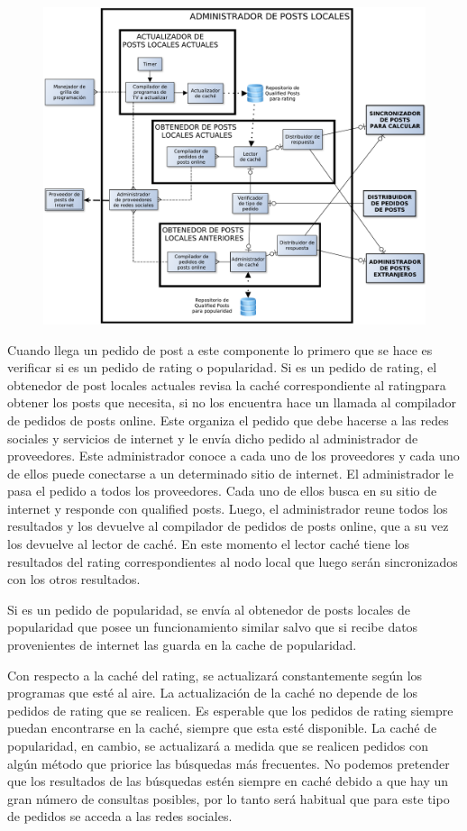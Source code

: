 \begin{figure}[H]
\centering
\includegraphics[width=\textwidth]{graph/adminlocal.pdf}
\end{figure}

Cuando llega un pedido de post a este componente lo primero que se hace es verificar si es un pedido de rating o popularidad. 
Si es un pedido de rating, el obtenedor de post locales actuales revisa la caché correspondiente al ratingpara obtener los posts que necesita, si no los encuentra hace un llamada al compilador de pedidos de posts online. Este organiza el pedido que debe hacerse a las redes sociales y servicios de internet y le envía dicho pedido al administrador de proveedores. Este administrador conoce a cada uno de los proveedores y cada uno de ellos puede conectarse a un determinado sitio de internet. El administrador le pasa el pedido a todos los proveedores. Cada uno de ellos busca en su sitio de internet y responde con qualified posts. Luego, el administrador reune todos los resultados y los devuelve al compilador de pedidos de posts online, que a su vez los devuelve al lector de caché. En este momento el lector caché tiene los resultados del rating correspondientes al nodo local que luego serán sincronizados con los otros resultados.

Si es un pedido de popularidad, se envía al obtenedor de posts locales de popularidad que posee un funcionamiento similar salvo que si recibe datos provenientes de internet las guarda en la cache de popularidad.

Con respecto a la caché del rating, se actualizará constantemente según los programas que esté al aire. La actualización de la caché no depende de los pedidos de rating que se realicen. Es esperable que los pedidos de rating siempre puedan encontrarse en la caché, siempre que esta esté disponible.
La caché de popularidad, en cambio, se actualizará a medida que se realicen pedidos con algún método que priorice las búsquedas más frecuentes. No podemos pretender que los resultados de las búsquedas estén siempre en caché debido a que hay un gran número de consultas posibles, por lo tanto será habitual que para este tipo de pedidos se acceda a las redes sociales. 
